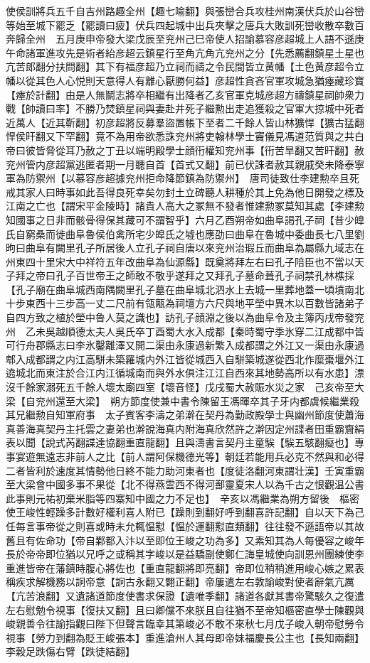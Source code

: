 使侯訓將兵五千自吉州路趣全州【趣七喻翻】與張巒合兵攻桂州南漢伏兵於山谷巒等始至城下罷乏【罷讀曰疲】伏兵四起城中出兵夾擊之唐兵大敗訓死巒收散卒數百奔歸全州　五月庚申帝發大梁戊辰至兖州己巳帝使人招諭慕容彦超城上人語不遜庚午命諸軍進攻先是術者紿彦超云鎮星行至角亢角亢兖州之分【先悉薦翻鎮星土星也亢苦郎翻分扶問翻】其下有福彦超乃立祠而禱之令民間皆立黄幡【土色黄彦超令立幡以從其色人心悦則天意得人有離心厭勝何益】彦超性貪吝官軍攻城急猶瘞藏珍寶【瘞於計翻】由是人無鬬志將卒相繼有出降者乙亥官軍克城彦超方禱鎮星祠帥衆力戰【帥讀曰率】不勝乃焚鎮星祠與妻赴井死子繼勲出走追獲殺之官軍大掠城中死者近萬人【近其靳翻】初彦超將反募羣盜置帳下至者二千餘人皆山林獷悍【獷古猛翻悍侯旰翻又下罕翻】竟不為用帝欲悉誅兖州將吏翰林學士竇儀見馮道范質與之共白帝曰彼皆脅從耳乃赦之丁丑以端明殿學士顔衎權知兖州事【衎苦旱翻又苦旰翻】赦兖州管内彦超黨逃匿者期一月聽自首【首式又翻】前已伏誅者赦其親戚癸未降泰寧軍為防禦州【以慕容彦超據兖州拒命降節鎮為防禦州】　唐司徒致仕李建勲卒且死戒其家人曰時事如此吾得良死幸矣勿封土立碑聽人耕種於其上免為他日開發之標及江南之亡也【謂宋平金陵時】諸貴人高大之冢無不發者惟建勲冢莫知其處【李建勲知國事之日非而骸骨得保其藏可不謂智乎】六月乙酉朔帝如曲阜謁孔子祠【昔少皥氏自窮桑而徙曲阜魯侯伯禽所宅少皥氏之墟也應劭曰曲阜在魯城中委曲長七八里劉昫曰曲阜有闕里孔子所居後人立孔子祠自唐以來兖州治瑕丘而曲阜為屬縣九域志在州東四十里宋大中祥符五年改曲阜為仙源縣】既奠將拜左右曰孔子陪臣也不當以天子拜之帝曰孔子百世帝王之師敢不敬乎遂拜之又拜孔子墓命葺孔子祠禁孔林樵採【孔子廟在曲阜城西南隅闕里孔子墓在曲阜城北泗水上去城一里葬地蓋一頃墳南北十步東西十三步高一丈二尺前有瓴甋為祠壇方六尺與地平塋中異木以百數皆諸弟子自四方致之植於塋中魯人莫之識也】訪孔子顔淵之後以為曲阜令及主簿丙戌帝發兖州　乙未吳越順德太夫人吳氏卒丁酉蜀大水入成都【秦時蜀守季氷穿二江成都中皆可行舟郡縣志曰李氷鑿離澤又開二渠由永康過新繁入成都謂之外江又一渠由永康過郫入成都謂之内江高駢未築羅城内外江皆從城西入自駢築城遂從西北作糜棗堰外江遶城北而東注於合江内江循城南而與外水俱注江江自西來其地勢高所以有水患】漂沒千餘家溺死五千餘人壞太廟四室【壞音怪】戊戌蜀大赦賑水災之家　己亥帝至大梁【自兖州還至大梁】　朔方節度使兼中書令陳留王馮暉卒其子牙内都虞候繼業殺其兄繼勲自知軍府事　太子賓客李濤之弟澣在契丹為勤政殿學士與幽州節度使蕭海真善海真契丹主托雲之妻弟也澣說海真内附海真欣然許之澣因定州諜者田重霸齎絹表以聞【說式芮翻諜達協翻重直龍翻】且與濤書言契丹主童騃【騃五駭翻癡也】專事宴遊無遠志非前人之比【前人謂阿保機德光等】朝廷若能用兵必克不然與和必得二者皆利於速度其情勢他日終不能力助河東者也【度徒洛翻河東謂壮漢】壬寅重霸至大梁會中國多事不果從【北不得燕雲西不得河鄯靈夏宋人以為千古之恨觀温公書此事則元祐初棄米脂等四寨知中國之力不足也】　辛亥以馮繼業為朔方留後　樞密使王峻性輕躁多計數好權利喜人附已【躁則到翻好呼到翻喜許記翻】自以天下為己任每言事帝從之則喜或時未允輒愠懟【愠於運翻懟直類翻】往往發不遜語帝以其故舊且有佐命功【帝自鄴都入汴以至即位王峻之功為多】又素知其為人每優容之峻年長於帝帝即位猶以兄呼之或稱其字峻以是益驕副使鄭仁誨皇城使向訓恩州團練使李重進皆帝在藩鎮時腹心將佐也【重直龍翻將即亮翻】帝即位稍稍進用峻心嫉之累表稱疾求解機務以詗帝意【詗古永翻又翾正翻】帝屢遣左右敦諭峻對使者辭氣亢厲【亢苦浪翻】又遺諸道節度使書求保證【遺唯季翻】諸道各獻其書帝驚駭久之復遣左右慰勉令視事【復扶又翻】且曰卿儻不來朕且自往猶不至帝知樞密直學士陳觀與峻親善令往諭指觀曰陛下但聲言臨幸其第峻必不敢不來秋七月戊子峻入朝帝慰勞令視事【勞力到翻為貶王峻張本】重進滄州人其母即帝妹福慶長公主也【長知兩翻】　李穀足跌傷右臂【跌徒結翻】